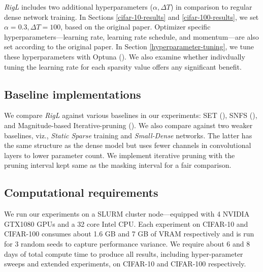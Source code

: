 \textit{RigL} includes two additional hyperparameters ($\alpha, \Delta T$) in comparison to regular dense network training. In Sections \ref{cifar-10-results} and \ref{cifar-100-results}, we set $\alpha=0.3, \Delta T = 100$, based on the original paper. Optimizer specific hyperparameters---learning rate, learning rate schedule, and momentum---are also set according to the original paper. In Section \ref{hyperparameter-tuning}, we tune these hyperparameters with Optuna (\citet{optuna_2019}). We also examine whether indivdually tuning the learning rate for each sparsity value offers any significant benefit.

\subsection{Baseline implementations}

We compare \textit{RigL} against various baselines in our experiments: SET (\citet{Mocanu2018SET}), SNFS (\citet{dettmers2020sparse}), and Magnitude-based Iterative-pruning (\citet{to_prune_or_not}). We also compare against two weaker baselines, viz., \textit{Static Sparse} training and \textit{Small-Dense} networks. The latter has the same structure as the dense model but uses fewer channels in convolutional layers to lower parameter count. We implement iterative pruning with the pruning interval kept same as the masking interval for a fair comparison. 

\subsection{Computational requirements}

We run our experiments on a SLURM cluster node---equipped with 4 NVIDIA GTX1080 GPUs and a 32 core Intel CPU. Each experiment on CIFAR-10 and CIFAR-100 consumes about 1.6 GB and 7 GB of VRAM respectively and is run for 3 random seeds to capture performance variance. We require about 6 and 8 days of total compute time to produce all results, including hyper-parameter sweeps and extended experiments, on CIFAR-10 and CIFAR-100 respectively.